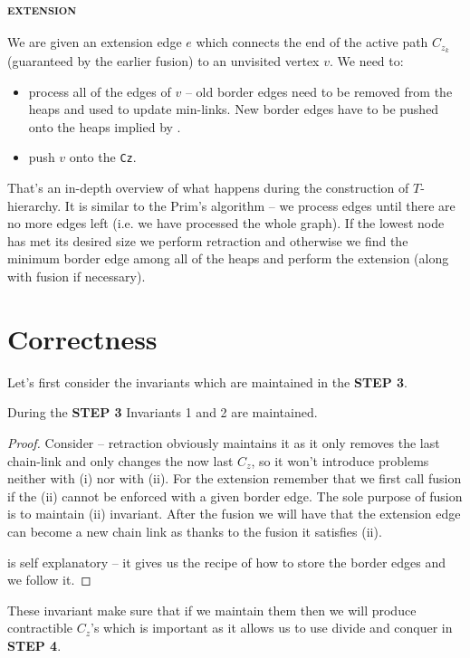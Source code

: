 \subsubsection{\textsc{extension}}
 We are given an extension edge $e$ which connects the end of the active path $C_{z_k}$ (guaranteed by the earlier fusion) to an unvisited vertex $v$. We need to:
\begin{itemize}
    \item process all of the edges of $v$ -- old border edges need to be removed from the heaps and used to update min-links. New border edges have to be pushed onto the heaps implied by .
    \item push $v$ onto the \texttt{Cz}.
\end{itemize}

That's an in-depth overview of what happens during the construction of $T$-hierarchy. It is similar to the Prim's algorithm -- we process edges until there are no more edges left (i.e. we have processed the whole graph). If the lowest node has met its desired size we perform retraction and otherwise we find the minimum border edge among all of the heaps and perform the extension (along with fusion if necessary).

\section{Correctness}
Let's first consider the invariants which are maintained in the \textbf{STEP 3}.
\begin{lemma}
    During the \textbf{STEP 3} Invariants 1 and 2 are maintained.
\end{lemma}
\begin{proof}
Consider  -- retraction obviously maintains it as it only removes the last chain-link and only changes the now last $C_z$, so it won't introduce problems neither with (i) nor with (ii). For the extension remember that we first call fusion if the (ii) cannot be enforced with a given border edge. The sole purpose of fusion is to maintain (ii) invariant. After the fusion we will have that the extension edge can become a new chain link as thanks to the fusion it satisfies (ii).

 is self explanatory -- it gives us the recipe of how to store the border edges and we follow it.
\end{proof}

These invariant make sure that if we maintain them then we will produce contractible $C_z$'s which is important as it allows us to use divide and conquer in \textbf{STEP 4}.


